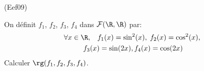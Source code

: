 \begin{tiny}(Eef09)\end{tiny} On définit $f_1$, $f_2$, $f_3$, $f_4$ dans $\mathcal{F}(\R,\R)$ par:
\begin{multline*}
 \forall x \in \R,\hspace{0.3cm} f_1(x)=\sin^2(x),\; f_2(x) = \cos^2(x),\;\\ f_3(x) = \sin(2x),
   f_4(x) = \cos(2x)
\end{multline*}
Calculer $\rg(f_1,f_2,f_3,f_4)$.